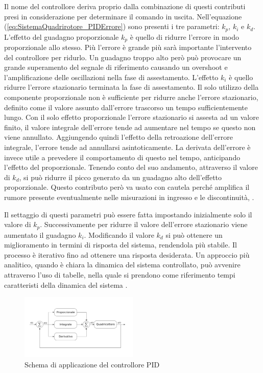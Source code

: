 Il nome del controllore deriva proprio dalla combinazione di questi contributi presi in considerazione per determinare il comando in uscita.
Nell'equazione (\ref{eq:SistemaQuadrirotore_PIDErrore}) sono presenti i tre parametri: $k_p$, $k_i$ e $k_d$.
L'effetto del guadagno proporzionale $k_p$ è quello di ridurre l'errore in modo proporzionale allo stesso. Più l'errore è grande più sarà importante l'intervento del controllore per ridurlo. Un guadagno troppo alto però può provocare un grande superamento del segnale di riferimento causando un overshoot e l'amplificazione delle oscillazioni nella fase di assestamento.
L'effetto $k_i$ è quello ridurre l'errore stazionario terminata la fase di assestamento. Il solo utilizzo della componente proporzionale non è sufficiente per ridurre anche l'errore stazionario, definito come il valore assunto dall'errore trascorso un tempo sufficientemente lungo. Con il solo effetto proporzionale l'errore stazionario si assesta ad un valore finito, il valore integrale dell'errore tende ad aumentare nel tempo se questo non viene annullato. Aggiungendo quindi l'effetto della retroazione dell'errore integrale, l'errore tende ad annullarsi asintoticamente.
La derivata dell'errore è invece utile a prevedere il comportamento di questo nel tempo, anticipando l'effetto del proporzionale. Tenendo conto del suo andamento, attraverso il valore di $k_d$, si può ridurre il picco generato da un guadagno alto dell'effetto proporzionale. Questo contributo però va usato con cautela perché amplifica il rumore presente eventualmente nelle misurazioni in ingresso e le discontinuità, \cite{advanced-pid-control}.

Il settaggio di questi parametri può essere fatta impostando inizialmente solo il valore di $k_p$. Successivamente per ridurre il valore dell'errore stazionario viene aumentato il guadagno $k_i$. Modificando il valore $k_d$ si può ottenere un miglioramento in termini di risposta del sistema, rendendola più stabile. Il processo è iterativo fino ad ottenere una risposta desiderata.
Un approccio più analitico, quando è chiara la dinamica del sistema controllato, può avvenire attraverso l'uso di tabelle, nella quale si prendono come riferimento tempi caratteristi della dinamica del sistema \cite{advanced-pid-control}.


\begin{figure}
	\centering
	\includegraphics[width=0.5\textwidth]{SistemaQuadrirotore/Figure/PID}
	\caption{Schema di applicazione del controllore PID}
\end{figure}

